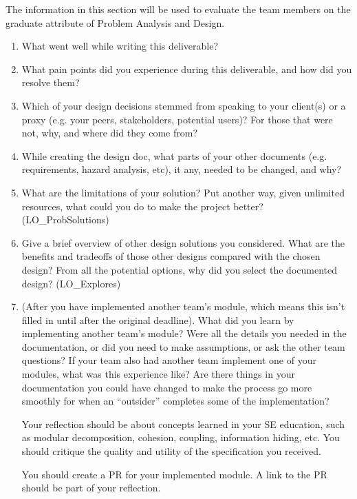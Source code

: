 \documentclass[12pt, titlepage]{article}
\begin{document}
The information in this section will be used to evaluate the team members on the
graduate attribute of Problem Analysis and Design.



\begin{enumerate}
  \item What went well while writing this deliverable? 
  \item What pain points did you experience during this deliverable, and how
    did you resolve them?
  \item Which of your design decisions stemmed from speaking to your client(s)
  or a proxy (e.g. your peers, stakeholders, potential users)? For those that
  were not, why, and where did they come from?
  \item While creating the design doc, what parts of your other documents (e.g.
  requirements, hazard analysis, etc), it any, needed to be changed, and why?
  \item What are the limitations of your solution?  Put another way, given
  unlimited resources, what could you do to make the project better? (LO\_ProbSolutions)
  \item Give a brief overview of other design solutions you considered.  What
  are the benefits and tradeoffs of those other designs compared with the chosen
  design?  From all the potential options, why did you select the documented design?
  (LO\_Explores)
  \item (After you have implemented another team's module, which means this
  isn't filled in until after the original deadline). What did you learn by
  implementing another team's module? Were all the details you needed in the
  documentation, or did you need to make assumptions, or ask the other team
  questions?  If your team also had another team implement one of your modules,
  what was this experience like?  Are there things in your documentation you
  could have changed to make the process go more smoothly for when an
  ``outsider'' completes some of the implementation?

  Your reflection should be about concepts learned in your SE education, such as modular decomposition, cohesion, coupling, information hiding, etc.  You should critique the quality and utility of the specification you received.

  You should create a PR for your implemented module.  A link to the PR should be part of your reflection.

\end{enumerate}
\end{document}
